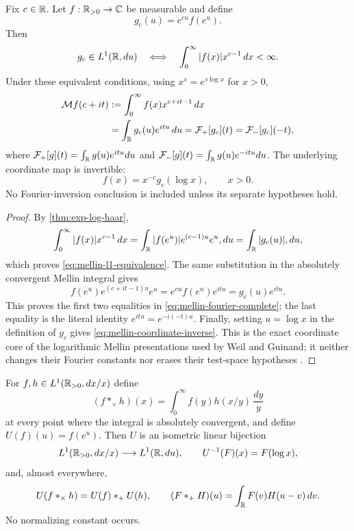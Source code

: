 \begin{theorem}
\label{thm:mellin-fourier-coordinate}
Fix $c\in\mathbb R$.  Let $f:\mathbb R_{>0}\to\mathbb C$ be measurable and define
\[
 g_c(u)=e^{cu}f(e^u).
\]
Then
\begin{equation}
 g_c\in L^1(\mathbb R,du)
 \quad\Longleftrightarrow\quad
 \int_0^\infty |f(x)|x^{c-1}\,dx<\infty.
 \label{eq:mellin-l1-equivalence}
\end{equation}
Under these equivalent conditions, using $x^s=e^{s\log x}$ for $x>0$,
\begin{align}
 \mathcal M f(c+it)
 &:=\int_0^\infty f(x)x^{c+it-1}\,dx \\
 &=\int_\mathbb R g_c(u)e^{itu}\,du
 =\mathcal F_+[g_c](t)
 =\mathcal F_-[g_c](-t),
 \label{eq:mellin-fourier-complete}
\end{align}
where
$\mathcal F_+[g](t)=\int_\mathbb R g(u)e^{itu}du$ and
$\mathcal F_-[g](t)=\int_\mathbb R g(u)e^{-itu}du$.
The underlying coordinate map is invertible:
\begin{equation}
 f(x)=x^{-c}g_c(\log x),\qquad x>0.
 \label{eq:mellin-coordinate-inverse}
\end{equation}
No Fourier-inversion conclusion is included unless its separate hypotheses
hold.
\end{theorem}

\begin{proof}
By \cref{thm:exp-log-haar},
\[
 \int_0^\infty |f(x)|x^{c-1}\,dx
 =\int_\mathbb R |f(e^u)|e^{(c-1)u}e^u,du
 =\int_\mathbb R |g_c(u)|,du,
\]
which proves \eqref{eq:mellin-l1-equivalence}.  The same substitution in the
absolutely convergent Mellin integral gives
\[
 f(e^u)e^{(c+it-1)u}e^u
 =e^{cu}f(e^u)e^{itu}=g_c(u)e^{itu}.
\]
This proves the first two equalities in
\eqref{eq:mellin-fourier-complete}; the last equality is the literal identity
$e^{itu}=e^{-i(-t)u}$.  Finally, setting $u=\log x$ in the definition of $g_c$
gives \eqref{eq:mellin-coordinate-inverse}.  This is the exact coordinate core
of the logarithmic Mellin presentations used by Weil and Guinand; it neither
changes their Fourier constants nor erases their test-space hypotheses
\cite[Collected Papers II, pp.~52--58]{weil1952}
\cite[p.~115]{guinand1948}.
\end{proof}

\begin{theorem}
\label{thm:multiplicative-additive-convolution}
For $f,h\in L^1(\mathbb R_{>0},dx/x)$ define
\[
 (f*_{\times}h)(x)=\int_0^\infty f(y)h(x/y)\,\frac{dy}{y}
\]
at every point where the integral is absolutely convergent, and define
$U(f)(u)=f(e^u)$.  Then $U$ is an isometric linear bijection
\[
 L^1(\mathbb R_{>0},dx/x)\longrightarrow L^1(\mathbb R,du),
 \qquad U^{-1}(F)(x)=F(\log x),
\]
and, almost everywhere,
\begin{equation}
 U(f*_{\times}h)=U(f)*_+U(h),
 \qquad
 (F*_+H)(u)=\int_\mathbb R F(v)H(u-v)\,dv.
 \label{eq:convolution-complete}
\end{equation}
No normalizing constant occurs.
\end{theorem}

